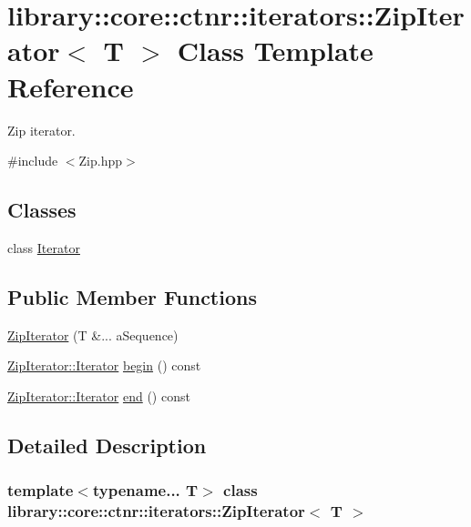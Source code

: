 \hypertarget{classlibrary_1_1core_1_1ctnr_1_1iterators_1_1_zip_iterator}{}\section{library\+::core\+::ctnr\+::iterators\+::Zip\+Iterator$<$ T $>$ Class Template Reference}
\label{classlibrary_1_1core_1_1ctnr_1_1iterators_1_1_zip_iterator}


Zip iterator.  




{\ttfamily \#include $<$Zip.\+hpp$>$}

\subsection*{Classes}
\begin{DoxyCompactItemize}
\item 
class \mbox{\hyperlink{classlibrary_1_1core_1_1ctnr_1_1iterators_1_1_zip_iterator_1_1_iterator}{Iterator}}
\end{DoxyCompactItemize}
\subsection*{Public Member Functions}
\begin{DoxyCompactItemize}
\item 
\mbox{\hyperlink{classlibrary_1_1core_1_1ctnr_1_1iterators_1_1_zip_iterator_a3d8960d14f07cf22a2de2994eabe46aa}{Zip\+Iterator}} (T \&... a\+Sequence)
\item 
\mbox{\hyperlink{classlibrary_1_1core_1_1ctnr_1_1iterators_1_1_zip_iterator_1_1_iterator}{Zip\+Iterator\+::\+Iterator}} \mbox{\hyperlink{classlibrary_1_1core_1_1ctnr_1_1iterators_1_1_zip_iterator_a0467e25b565ac7b73b22a7002b87d189}{begin}} () const
\item 
\mbox{\hyperlink{classlibrary_1_1core_1_1ctnr_1_1iterators_1_1_zip_iterator_1_1_iterator}{Zip\+Iterator\+::\+Iterator}} \mbox{\hyperlink{classlibrary_1_1core_1_1ctnr_1_1iterators_1_1_zip_iterator_a91c3191909df9dcc737f14d9e38d9a78}{end}} () const
\end{DoxyCompactItemize}


\subsection{Detailed Description}
\subsubsection*{template$<$typename... T$>$\newline
class library\+::core\+::ctnr\+::iterators\+::\+Zip\+Iterator$<$ T $>$}

